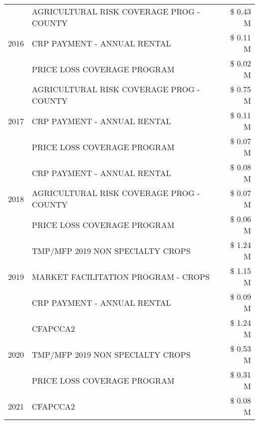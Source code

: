 \begin{tabular}{llr}
\cline{1-3}
\multirow[t]{3}{*}{2016} & AGRICULTURAL RISK COVERAGE PROG - COUNTY & \$ 0.43 M \\
 & CRP PAYMENT - ANNUAL RENTAL & \$ 0.11 M \\
 & PRICE LOSS COVERAGE PROGRAM & \$ 0.02 M \\
\cline{1-3}
\multirow[t]{3}{*}{2017} & AGRICULTURAL RISK COVERAGE PROG - COUNTY & \$ 0.75 M \\
 & CRP PAYMENT - ANNUAL RENTAL & \$ 0.11 M \\
 & PRICE LOSS COVERAGE PROGRAM & \$ 0.07 M \\
\cline{1-3}
\multirow[t]{3}{*}{2018} & CRP PAYMENT - ANNUAL RENTAL & \$ 0.08 M \\
 & AGRICULTURAL RISK COVERAGE PROG - COUNTY & \$ 0.07 M \\
 & PRICE LOSS COVERAGE PROGRAM & \$ 0.06 M \\
\cline{1-3}
\multirow[t]{3}{*}{2019} & TMP/MFP 2019 NON SPECIALTY CROPS & \$ 1.24 M \\
 & MARKET FACILITATION PROGRAM - CROPS & \$ 1.15 M \\
 & CRP PAYMENT - ANNUAL RENTAL & \$ 0.09 M \\
\cline{1-3}
\multirow[t]{3}{*}{2020} & CFAPCCA2 & \$ 1.24 M \\
 & TMP/MFP 2019 NON SPECIALTY CROPS & \$ 0.53 M \\
 & PRICE LOSS COVERAGE PROGRAM & \$ 0.31 M \\
\cline{1-3}
2021 & CFAPCCA2 & \$ 0.08 M \\
\cline{1-3}
\bottomrule
\end{tabular}
